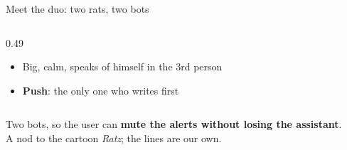 \documentclass[aspectratio=169,11pt]{beamer}
\begin{document}
\begin{frame}{Meet the duo: two rats, two bots}
\begin{columns}[T,onlytextwidth]
\begin{column}{0.49\textwidth}
\begin{minipage}[t]{\dimexpr\linewidth-3.4cm}
\begin{itemize}
          \item Big, calm, speaks of himself in the 3rd person
          \item \textbf{Push}: the only one who writes first
        \end{itemize}
      \end{minipage}
    \end{column}
  \end{columns}
  \vspace{6pt}
  \centering\scriptsize\color{soft}
  Two bots, so the user can \textbf{mute the alerts without losing the assistant}.\\ A nod to the cartoon \emph{Ratz}; the lines are our own.
\end{frame}

\end{document}
